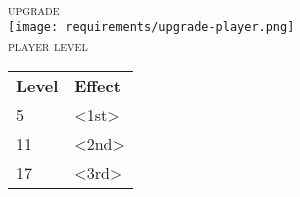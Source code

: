 \vspace{-4mm}
\centering{\rule{\textwidth}{0.7pt}}\\

\begin{minipage}[t]{\textwidth}
	\scriptsize
	\begin{minipage}[c]{0.2\textwidth}
		\vspace{1mm}
		\centering
		\textsc{upgrade}\\
		\texttt{[image: requirements/upgrade-player.png]}\\
		\tiny\textsc{player level}
	\end{minipage}
	\hfill
	\setlength{\tabcolsep}{0.5em}
	\begin{tabularx}{0.75\textwidth}{lX}
		\textbf{Level}	& \textbf{Effect}\\
		\rowcolor{dnd-lightgreen}
		5				& <1st>\\
		11				& <2nd>\\
		\rowcolor{dnd-lightgreen}
		17				& <3rd>
	\end{tabularx}
\end{minipage}

